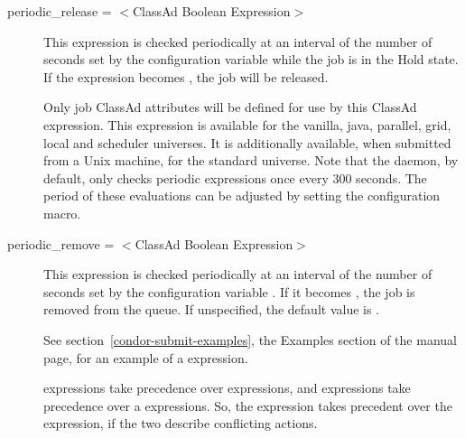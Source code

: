 \begin{description}

\item[periodic\_release = $<$ClassAd Boolean Expression$>$]
This expression is checked periodically at an interval of
the number of seconds set by
the configuration variable 
while the job is in the Hold state.
If the expression becomes , the job will be released.

%

Only job ClassAd attributes will be defined for use by this ClassAd expression.
This expression is available for the vanilla, java, parallel, grid,
local and scheduler universes.
It is additionally available, when submitted from a Unix machine,
for the standard universe.  Note that the  daemon,
by default, only checks
periodic expressions once every 300 seconds.  The period of
these evaluations can be adjusted by setting the
 configuration macro.


\item[periodic\_remove = $<$ClassAd Boolean Expression$>$]
This expression is checked periodically at an interval of
the number of seconds set by
the configuration variable .
If it becomes , the job is removed from the queue.
If unspecified, the default value is .

See section~\ref{condor-submit-examples},
the Examples section of the  manual page,
for an example of a  expression.

 expressions take
precedence over  expressions,
and  expressions take
precedence over a  expressions.
So, the  expression takes precedent over
the  expression,
if the two describe conflicting actions.


\end{description}
